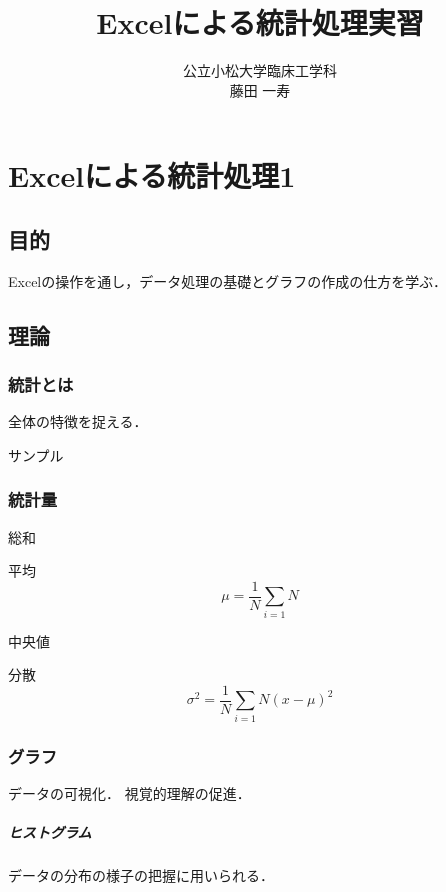 \documentclass[12pt, a4j]{jreport}
\title{Excelによる統計処理実習}
\author{公立小松大学臨床工学科 \\ 藤田 一寿}
\date{}
\begin{document}
\maketitle

\chapter{Excelによる統計処理1}

\section{目的}

Excelの操作を通し，データ処理の基礎とグラフの作成の仕方を学ぶ．

\section{理論}

\subsection{統計とは}


全体の特徴を捉える．

サンプル

\subsection{統計量}

総和


平均
\begin{equation}
    \mu = \frac{1}{N} \sum_{i=1}{N}
\end{equation}

中央値

分散
\begin{equation}
    \sigma^2 = \frac{1}{N} \sum_{i=1}{N} (x - \mu)^2
\end{equation}

\subsection{グラフ}

データの可視化．
視覚的理解の促進．

\paragraph{ヒストグラム}

データの分布の様子の把握に用いられる．
\end{document}

